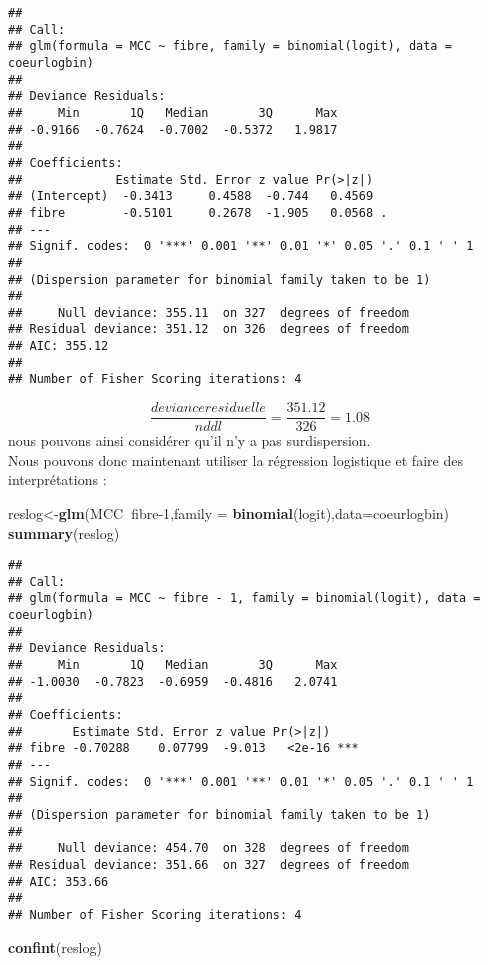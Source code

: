 \documentclass[
]{article}
\newenvironment{Shaded}{\begin{snugshade}}{\end{snugshade}}
\newcommand{\DataTypeTok}[1]{\textcolor[rgb]{0.13,0.29,0.53}{#1}}
\newcommand{\DecValTok}[1]{\textcolor[rgb]{0.00,0.00,0.81}{#1}}
\newcommand{\KeywordTok}[1]{\textcolor[rgb]{0.13,0.29,0.53}{\textbf{#1}}}
\newcommand{\NormalTok}[1]{#1}
\newcommand{\OperatorTok}[1]{\textcolor[rgb]{0.81,0.36,0.00}{\textbf{#1}}}
\begin{document}
\begin{verbatim}
## 
## Call:
## glm(formula = MCC ~ fibre, family = binomial(logit), data = coeurlogbin)
## 
## Deviance Residuals: 
##     Min       1Q   Median       3Q      Max  
## -0.9166  -0.7624  -0.7002  -0.5372   1.9817  
## 
## Coefficients:
##             Estimate Std. Error z value Pr(>|z|)  
## (Intercept)  -0.3413     0.4588  -0.744   0.4569  
## fibre        -0.5101     0.2678  -1.905   0.0568 .
## ---
## Signif. codes:  0 '***' 0.001 '**' 0.01 '*' 0.05 '.' 0.1 ' ' 1
## 
## (Dispersion parameter for binomial family taken to be 1)
## 
##     Null deviance: 355.11  on 327  degrees of freedom
## Residual deviance: 351.12  on 326  degrees of freedom
## AIC: 355.12
## 
## Number of Fisher Scoring iterations: 4
\end{verbatim}

\[\frac{deviance residuelle}{nddl}=\frac{351.12}{326}=1.08\] nous
pouvons ainsi considérer qu'il n'y a pas surdispersion.\\

Nous pouvons donc maintenant utiliser la régression logistique et faire
des interprétations :\\

\begin{Shaded}
\begin{Highlighting}[]
\NormalTok{reslog<-}\KeywordTok{glm}\NormalTok{(MCC}\OperatorTok{~}\NormalTok{fibre}\DecValTok{-1}\NormalTok{,}\DataTypeTok{family =} \KeywordTok{binomial}\NormalTok{(logit),}\DataTypeTok{data=}\NormalTok{coeurlogbin)}
\KeywordTok{summary}\NormalTok{(reslog)}
\end{Highlighting}
\end{Shaded}

\begin{verbatim}
## 
## Call:
## glm(formula = MCC ~ fibre - 1, family = binomial(logit), data = coeurlogbin)
## 
## Deviance Residuals: 
##     Min       1Q   Median       3Q      Max  
## -1.0030  -0.7823  -0.6959  -0.4816   2.0741  
## 
## Coefficients:
##       Estimate Std. Error z value Pr(>|z|)    
## fibre -0.70288    0.07799  -9.013   <2e-16 ***
## ---
## Signif. codes:  0 '***' 0.001 '**' 0.01 '*' 0.05 '.' 0.1 ' ' 1
## 
## (Dispersion parameter for binomial family taken to be 1)
## 
##     Null deviance: 454.70  on 328  degrees of freedom
## Residual deviance: 351.66  on 327  degrees of freedom
## AIC: 353.66
## 
## Number of Fisher Scoring iterations: 4
\end{verbatim}

\begin{Shaded}
\begin{Highlighting}[]
\KeywordTok{confint}\NormalTok{(reslog)}
\end{Highlighting}
\end{Shaded}
\end{document}
